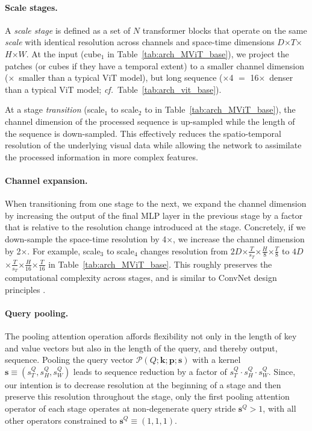\documentclass[10pt,twocolumn,letterpaper]{article}
\newcommand{\tblref}[1]{Table~\ref{#1}}
\def\x{$\times$}
\begin{document}
\paragraph{Scale stages.}
A \textit{scale stage} is defined as a set of $N$ transformer blocks that operate on the same \textit{scale} with identical  resolution across channels and space-time dimensions $D$\x$T$\x$H$\x$W$.  At the input (cube$_1$ in \tblref{tab:arch_MViT_base}), we project the patches (or cubes if they have a temporal extent) to a smaller channel dimension (\x~smaller than a typical ViT model), but long sequence (\x4 $=$ 16\x~denser than a typical ViT model; \textit{cf.}~\tblref{tab:arch_vit_base}).

At a stage \textit{transition} (\eg scale$_1$ to  scale$_2$ to   in \tblref{tab:arch_MViT_base}), the channel dimension of the processed sequence is up-sampled while the length of the sequence is down-sampled. This effectively reduces the spatio-temporal resolution of the underlying visual data while allowing the network to assimilate the processed information in more complex features. 


\paragraph{Channel expansion.} \label{sec:channel_growth}
 When transitioning from one stage to the next, we expand the channel dimension by increasing the output of the final MLP layer in the previous stage by a factor that is relative to the resolution change introduced at the stage. Concretely, if we down-sample the space-time resolution by 4\x, we increase the channel dimension by 2\x. For example, scale$_3$ to  scale$_4$ changes resolution from  $2D$\x$\frac{T}{s_T}$\x$\frac{H}{8}$\x$\frac{T}{8}$ to $4D$\x$\frac{T}{s_T}$\x$\frac{H}{16}$\x$\frac{T}{16}$ in \tblref{tab:arch_MViT_base}.  This roughly preserves the computational complexity across stages, and is similar to ConvNet design principles \cite{Simonyan2014,He2016}. 

 \paragraph{Query pooling.} The pooling attention operation affords flexibility not only in the length of key and value vectors but also in the length of the query, and thereby output, sequence. Pooling the query vector $\mathcal{P}(Q; \mathbf{k}; \mathbf{p}; \mathbf{s})$ with a kernel $\mathbf{s} \equiv (s^Q_T,s^Q_H,s^Q_W)$ leads to sequence reduction by a factor of $s^Q_T \cdot s^Q_H \cdot s^Q_W$. Since, our intention is to decrease resolution at the beginning of a stage and then preserve this resolution throughout the stage, only the first pooling attention operator of each stage operates at non-degenerate query stride $\mathbf{s}^Q > 1$, with all other operators constrained to $\mathbf{s}^Q \equiv (1,1,1)$.   
\end{document}
